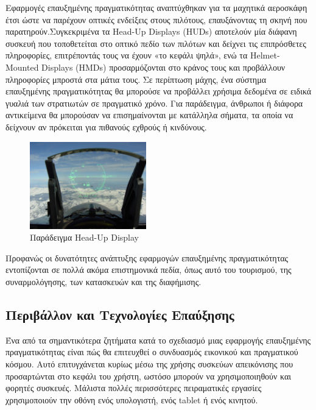 Εφαρμογές επαυξημένης πραγματικότητας αναπτύχθηκαν για τα μαχητικά αεροσκάφη έτσι ώστε να παρέχουν οπτικές ενδείξεις στους πιλότους, επαυξάνοντας τη σκηνή που παρατηρούν.Συγκεκριμένα τα Head-Up Displays (HUDs) αποτελούν μία διάφανη συσκευή που τοποθετείται στο οπτικό πεδίο των πιλότων και δείχνει τις επιπρόσθετες πληροφορίες, επιτρέποντάς τους να έχουν «το κεφάλι ψηλά», ενώ τα Helmet-Mounted Displays (HMDs) προσαρμόζονται στο κράνος τους και προβάλλουν πληροφορίες μπροστά στα μάτια τους. Σε περίπτωση μάχης, ένα σύστημα επαυξημένης πραγματικότητας θα μπορούσε να προβάλλει χρήσιμα δεδομένα σε ειδικά γυαλιά των στρατιωτών σε πραγματικό χρόνο. Για παράδειγμα, άνθρωποι ή διάφορα αντικείμενα θα μπορούσαν να επισημαίνονται με κατάλληλα σήματα, τα οποία να δείχνουν αν πρόκειται για πιθανούς εχθρούς ή κινδύνους. 


\begin{figure}[H]
    \centering
    \includegraphics[width=0.45\textwidth]{Files/Figures/hud.jpg}
    \caption[Παράδειγμα Head-Up Display]{Παράδειγμα Head-Up Display}
    \label{fig:hud}
\end{figure}



Προφανώς οι δυνατότητες ανάπτυξης εφαρμογών επαυξημένης πραγματικότητας εντοπίζονται σε πολλά ακόμα επιστημονικά πεδία, όπως αυτό του τουρισμού, της συναρμολόγησης, των κατασκευών και της διαφήμισης.



\subsection{Περιβάλλον και Τεχνολογίες Επαύξησης}

Ένα από τα σημαντικότερα ζητήματα κατά το σχεδιασμό μιας εφαρμογής επαυξημένης πραγματικότητας είναι πώς θα επιτευχθεί ο συνδυασμός εικονικού και πραγματικού κόσμου. Αυτό επιτυγχάνεται κυρίως μέσω της χρήσης συσκεύων απεικόνισης που προσαρτώνται στο κεφάλι του χρήστη, ωστόσο μπορούν να χρησιμοποιηθούν και φορητές συσκευές. Μάλιστα πολλές περισσότερες πειραματικές εργασίες χρησιμοποιούν την οθόνη ενός υπολογιστή, ενός tablet ή ενός κινητού.


